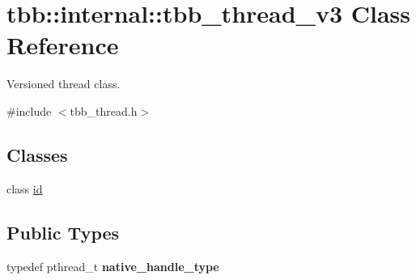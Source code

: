 \hypertarget{classtbb_1_1internal_1_1tbb__thread__v3}{}\section{tbb\+:\+:internal\+:\+:tbb\+\_\+thread\+\_\+v3 Class Reference}
\label{classtbb_1_1internal_1_1tbb__thread__v3}


Versioned thread class.  




{\ttfamily \#include $<$tbb\+\_\+thread.\+h$>$}

\subsection*{Classes}
\begin{DoxyCompactItemize}
\item 
class \hyperlink{classtbb_1_1internal_1_1tbb__thread__v3_1_1id}{id}
\end{DoxyCompactItemize}
\subsection*{Public Types}
\begin{DoxyCompactItemize}
\item 
\hypertarget{classtbb_1_1internal_1_1tbb__thread__v3_a30e64e2a6bef43e2fd847e6c60a31207}{}typedef pthread\+\_\+t {\bfseries native\+\_\+handle\+\_\+type}\label{classtbb_1_1internal_1_1tbb__thread__v3_a30e64e2a6bef43e2fd847e6c60a31207}

\end{DoxyCompactItemize}
